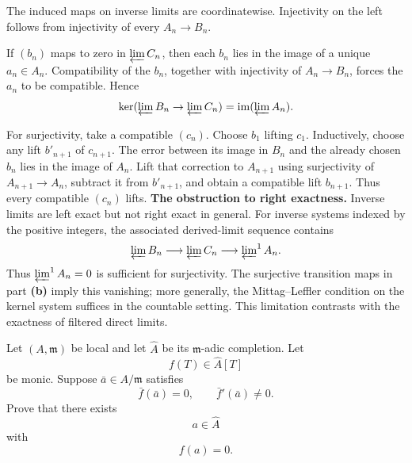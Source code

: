 \begin{solution}
The induced maps on inverse limits are coordinatewise. Injectivity on the
left follows from injectivity of every \(A_n\to B_n\).

If \((b_n)\) maps to zero in \(\varprojlim C_n\), then each \(b_n\) lies in
the image of a unique \(a_n\in A_n\). Compatibility of the \(b_n\), together
with injectivity of \(A_n\to B_n\), forces the \(a_n\) to be compatible.
Hence
\[
\ker(\varprojlim B_n\to\varprojlim C_n)
=
\operatorname{im}(\varprojlim A_n).
\]

For surjectivity, take a compatible \((c_n)\). Choose \(b_1\) lifting
\(c_1\). Inductively, choose any lift \(b'_{n+1}\) of \(c_{n+1}\). The error
between its image in \(B_n\) and the already chosen \(b_n\) lies in the image
of \(A_n\). Lift that correction to \(A_{n+1}\) using surjectivity of
\(A_{n+1}\to A_n\), subtract it from \(b'_{n+1}\), and obtain a compatible
lift \(b_{n+1}\). Thus every compatible \((c_n)\) lifts.
\medskip
\noindent\textbf{The obstruction to right exactness.}
Inverse limits are left exact but not right exact in general.
For inverse systems indexed by the positive integers, the associated
derived-limit sequence contains
\[
\varprojlim B_n\longrightarrow\varprojlim C_n
\longrightarrow\varprojlim\nolimits^{1} A_n.
\]
Thus $\varprojlim^{1} A_n=0$ is sufficient for surjectivity.
The surjective transition maps in part \textbf{(b)} imply this
vanishing; more generally, the Mittag--Leffler condition on the
kernel system suffices in the countable setting. This limitation
contrasts with the exactness of filtered direct limits.

\end{solution}


\begin{problem}[CP-V-0088]
\label{prob:cp-v-0088}
Let \((A,\mathfrak m)\) be local and let \(\widehat A\) be its
\(\mathfrak m\)-adic completion. Let
\[
f(T)\in\widehat A[T]
\]
be monic. Suppose \(\bar a\in A/\mathfrak m\) satisfies
\[
\bar f(\bar a)=0,
\qquad
\bar f'(\bar a)\ne0.
\]
Prove that there exists
\[
a\in\widehat A
\]
with
\[
f(a)=0.
\]
\end{problem}

